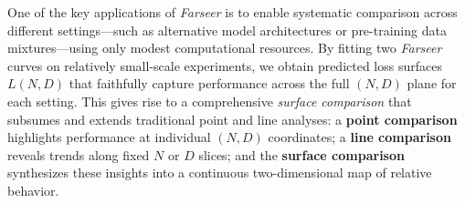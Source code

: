 \documentclass{article}
\begin{document}





One of the key applications of \textit{Farseer} is to enable systematic comparison across different settings—such as alternative model architectures or pre-training data mixtures—using only modest computational resources. By fitting two \textit{Farseer} curves on relatively small-scale experiments, we obtain predicted loss surfaces \(L(N,D)\) that faithfully capture performance across the full \((N,D)\) plane for each setting. This gives rise to a comprehensive \emph{surface comparison} that subsumes and extends traditional point and line analyses: a \textbf{point comparison} highlights performance at individual \((N,D)\) coordinates; a \textbf{line comparison} reveals trends along fixed \(N\) or \(D\) slices; and the \textbf{surface comparison} synthesizes these insights into a continuous two-dimensional map of relative behavior.
\end{document}
